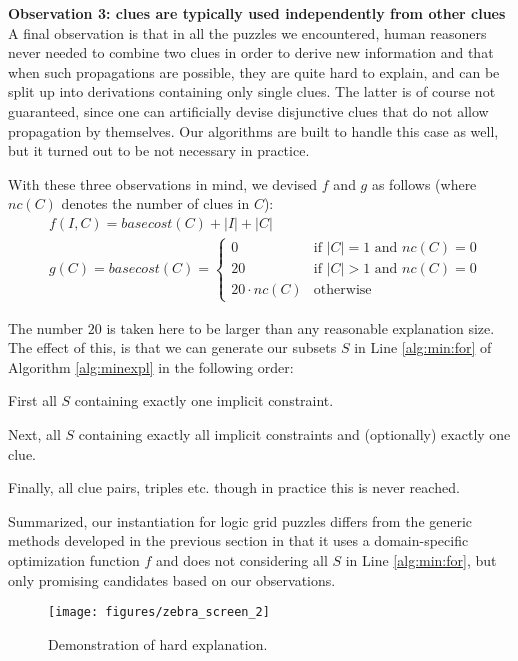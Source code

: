 \textbf{Observation 3: clues are typically used independently from other clues} 
A final observation is that in all the puzzles we encountered, human reasoners never needed to combine two clues in order to derive new information and that when such propagations are possible, they are quite hard to explain, and can be split up into derivations containing only single clues.
The latter is of course not guaranteed, since one can artificially devise disjunctive clues that do not allow propagation by themselves. 
Our algorithms are built to handle this case as well, but it turned out to be not necessary in practice. 

With these three observations in mind, we devised $f$ and $g$ as follows (where $nc(C)$ denotes the number of clues in $C$): \label{sec:cost}
\begin{align*}&f(I,C) = basecost(C) + |I| + |C|\\
&g(C) = basecost(C) = \left\{\begin{array}{ll}
                               0 & \text{if $|C|=1$ and $nc(C) = 0$}\\
                               20 & \text{if $|C|>1$ and $nc(C)=0$}\\
                               20\cdot nc(C) & \text{otherwise}
                              \end{array}\right.
                              \end{align*}
                              
The number $20$ is taken here to be larger than any reasonable explanation size. 
The effect of this,  is that we can generate our subsets $S$ in Line \ref{alg:min:for}
 of Algorithm \ref{alg:minexpl} in the following order:
\begin{compactitem}
 \item First all $S$ containing exactly one implicit constraint.
 \item Next, all $S$ containing exactly all implicit constraints and (optionally) exactly one clue.
 \item Finally, all clue pairs, triples etc. though in practice this is never reached.
\end{compactitem}
Summarized, our instantiation for logic grid puzzles differs from the generic methods developed in the previous section in that it uses a domain-specific optimization function $f$ and does not considering all $S$ in Line \ref{alg:min:for}, but only promising candidates based on our observations.

\begin{figure}[ht]
\centering
\texttt{[image: figures/zebra\_screen\_2]}
\caption{Demonstration of hard explanation.}
\label{fig:screen2}
\end{figure}

